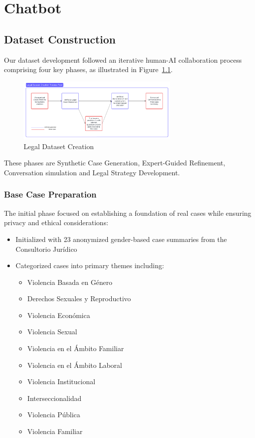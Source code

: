 \chapter{Chatbot}
\section{Dataset Construction}
\label{sec:dataset}

Our dataset development followed an iterative human-AI collaboration process comprising four key phases, 
as illustrated in Figure~\ref{fig:legal_data}.

\begin{figure}[htbp]
    \centering
    \includegraphics[width=0.7\textwidth]{figures/Legal_dataset.png}
    \caption{Legal Dataset Creation}
    \label{fig:legal_data}
\end{figure}

These phases are Synthetic Case Generation, Expert-Guided Refinement, Conversation simulation and Legal Strategy Development.

\subsection{Base Case Preparation}
The initial phase focused on establishing a foundation of real cases while ensuring privacy and ethical considerations:
\begin{itemize}
    \item Initialized with 23 anonymized gender-based case summaries from the Consultorio Jurídico
    \item Categorized cases into primary themes including:
    \begin{itemize}
        \item Violencia Basada en Género
        \item Derechos Sexuales y Reproductivo
        \item Violencia Económica
        \item Violencia Sexual
        \item Violencia en el Ámbito Familiar
        \item Violencia en el Ámbito Laboral
        \item Violencia Institucional
        \item Interseccionalidad
        \item Violencia Pública
        \item Violencia Familiar
    \end{itemize}
\end{itemize}


